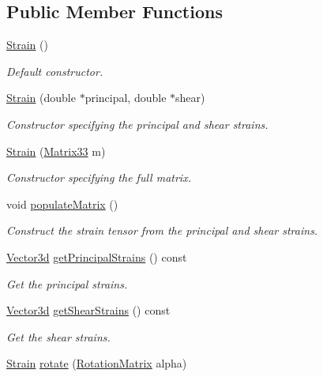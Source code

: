 \subsection*{Public Member Functions}
\begin{DoxyCompactItemize}
\item 
\hyperlink{classStrain_ad7580e057dd173ba4a4609f4edfe6e38}{Strain} ()
\begin{DoxyCompactList}\small\item\em Default constructor. \end{DoxyCompactList}\item 
\hyperlink{classStrain_a808b5a0e273cc87e19138f3be221fe53}{Strain} (double $\ast$principal, double $\ast$shear)
\begin{DoxyCompactList}\small\item\em Constructor specifying the principal and shear strains. \end{DoxyCompactList}\item 
\hyperlink{classStrain_a411164cde64f3c51520440f928fb8fd8}{Strain} (\hyperlink{classMatrix33}{Matrix33} m)
\begin{DoxyCompactList}\small\item\em Constructor specifying the full matrix. \end{DoxyCompactList}\item 
void \hyperlink{classStrain_a53d0c01b18a8c70da97ad4aaeb924f14}{populate\-Matrix} ()
\begin{DoxyCompactList}\small\item\em Construct the strain tensor from the principal and shear strains. \end{DoxyCompactList}\item 
\hyperlink{classVector3d}{Vector3d} \hyperlink{classStrain_a441936c89c087ec4ca9927e914a2cece}{get\-Principal\-Strains} () const 
\begin{DoxyCompactList}\small\item\em Get the principal strains. \end{DoxyCompactList}\item 
\hyperlink{classVector3d}{Vector3d} \hyperlink{classStrain_a12320d54bd51c0e31159da2d30a8f380}{get\-Shear\-Strains} () const 
\begin{DoxyCompactList}\small\item\em Get the shear strains. \end{DoxyCompactList}\item 
\hyperlink{classStrain}{Strain} \hyperlink{classStrain_a39acbb854eea7868d2b88c6106e80d18}{rotate} (\hyperlink{classRotationMatrix}{Rotation\-Matrix} alpha)

\end{DoxyCompactItemize}

